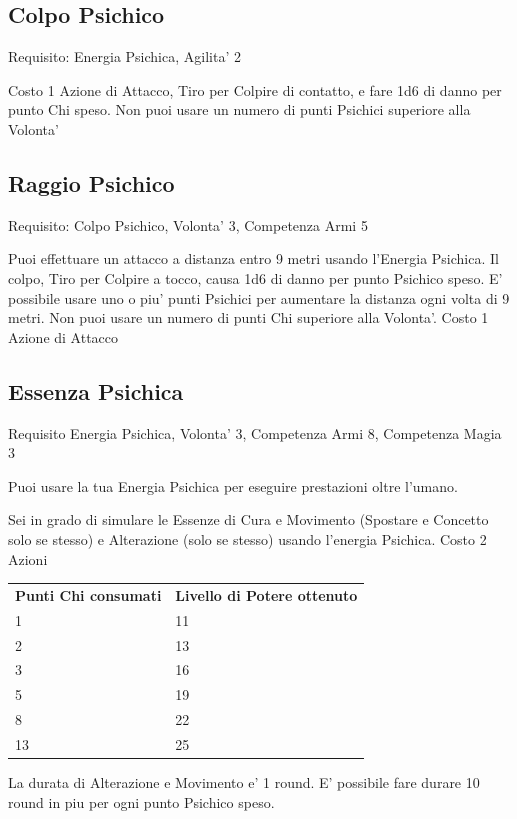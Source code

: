 \documentclass[a4paper,11pt,twoside,openany]{book}
\begin{document}
\subsection{Colpo Psichico}

Requisito: Energia Psichica, Agilita' 2

Costo 1 Azione di Attacco, Tiro per Colpire di contatto, e fare 1d6 di danno per punto Chi speso. Non puoi usare un numero di punti Psichici superiore alla Volonta'

\subsection{Raggio Psichico}

Requisito: Colpo Psichico, Volonta' 3, Competenza Armi 5

Puoi effettuare un attacco a distanza entro 9 metri usando l'Energia Psichica. Il colpo, Tiro per Colpire a tocco, causa 1d6 di danno per punto Psichico speso. E' possibile usare uno o piu' punti Psichici per aumentare la distanza ogni volta di 9 metri. Non puoi usare un numero di punti Chi superiore alla Volonta'. Costo 1 Azione di Attacco

\subsection{Essenza Psichica}

Requisito Energia Psichica, Volonta' 3, Competenza Armi 8, Competenza
Magia 3

Puoi usare la tua Energia Psichica per eseguire prestazioni oltre
l'umano.

Sei in grado di simulare le Essenze di Cura e Movimento (Spostare e Concetto solo se stesso) e Alterazione (solo se stesso) usando l'energia Psichica. Costo 2 Azioni

\bigskip

\begin{tabular}{ll}
\toprule
\textbf{Punti Chi consumati} & \textbf{Livello di Potere ottenuto}\tabularnewline
1 & 11\tabularnewline
2 & 13\tabularnewline
3 & 16\tabularnewline
5 & 19\tabularnewline
8 & 22\tabularnewline
13 & 25\tabularnewline

\end{tabular}

\bigskip

La durata di Alterazione e Movimento e' 1 round. E' possibile fare durare 10 round in piu per ogni punto Psichico speso.
\end{document}
